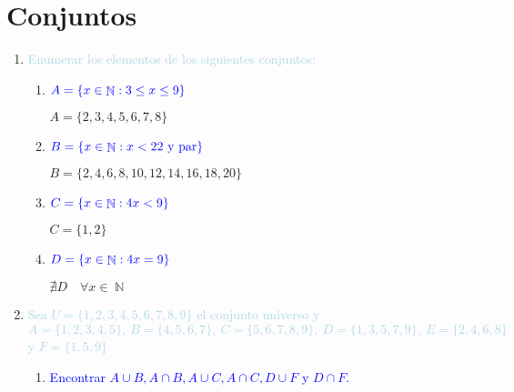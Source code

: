 \documentclass[12pt]{article}
\newcommand{\lb}[1]{\textcolor{lightblue}{#1}}
\newcommand{\db}[1]{\textcolor{blue}{#1}}
\DeclareMathOperator{\N}{\mathbb{N}}
\begin{document}
\section{Conjuntos}
\begin{enumerate}[label=\color{red}\textbf{\arabic*)},leftmargin=*]
      \item \lb{Enumerar los elementos de los siguientes conjuntos:}
      \begin{enumerate}[label=\color{red}\alph*)]
      	\item $\db{A=\{x\in\N:3\le x\le 9\}}$
      	
      	$A=\{2,3,4,5,6,7,8\}$
      	\item $\db{B=\{x\in\N:x<22\text{ y par}\}}$
      	
      	$B=\{2,4,6,8,10,12,14,16,18, 20\}$
      	\item $\db{C=\{x\in\N:4x<9\}}$
      	
      	$C=\{1,2\}$
      	\item $\db{D=\{x\in\N:4x=9\}}$
      	
      	$\nexists D\quad\forall x\in\N$
      	\end{enumerate}
      \item \lb{Sea $U=\{1,2,3,4,5,6,7,8,9\}$ el conjunto universo y $A=\{1,2,3,4,5\},\:B=\{4,5,6,7\},\:C=\{5,6,7,8,9\},\:D=\{1,3,5,7,9\},\:E=\{2,4,6,8\}$ y $F=\{1,5,9\}$}
      \begin{enumerate}[label=\color{red}\alph*)]
      	\item \db{Encontrar $A\cup B,A\cap B,A\cup C,A\cap C,D\cup F$ y $D\cap F$.}
      	

\end{enumerate}
\end{enumerate}
\end{document}
